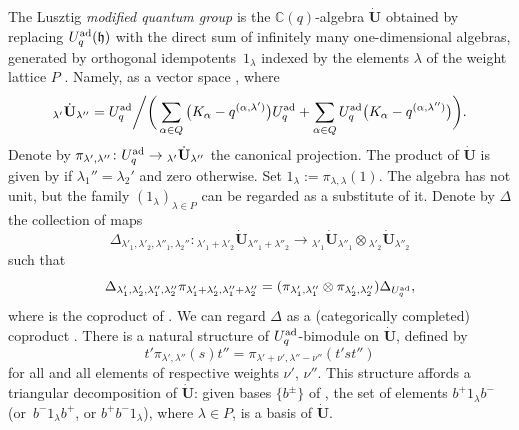 \documentclass[10pt,a4paper]{amsart}
\numberwithin{equation}{section}
\theoremstyle{definition}
\newcommand{\mc}{\mathbb{C}}
\newcommand{\ra}{\rightarrow}
\begin{document}
The Lusztig {\it modified quantum group} is the $\mc(q)$-algebra $\dot{\mathbf{U}}$ obtained by replacing $U_q^{\rm ad}(\mathfrak{h})$ with the direct sum of infinitely many one-dimensional algebras, generated by orthogonal idempotents~$1_\lambda$ indexed by the elements $\lambda$ of the weight lattice $P$ \cite[Chapter~23]{Lusztig}. Namely, as a vector space , where
\[{}_{\lambda'}\dot{\mathbf{U}}{}_{\lambda''} = U_q^{\rm ad}\bigg/\bigg(\sum_{\alpha\in Q} \big(K_\alpha -q^{(\alpha,\lambda')}\big)U_q^{\rm ad}+ \sum_{\alpha\in Q} U_q^{\rm ad}\big(K_\alpha -q^{(\alpha,\lambda'')}\big)\bigg).\]
Denote by $\pi_{\lambda',\lambda''}\colon U_q^{\rm ad} \ra {}_{\lambda'}\dot{\mathbf{U}}{}_{\lambda''}$ the canonical projection. The product of $\dot{\mathbf{U}}$ is given by  if $\lambda_1''=\lambda_2'$ and zero otherwise. Set $1_\lambda := \pi_{\lambda,\lambda}(1)$. The algebra  has not unit, but the family $(1_\lambda)_{\lambda\in P}$ can be regarded as a substitute of it. Denote by $\Delta$ the collection of maps
\[
\Delta_{\lambda'_1,\lambda'_2,\lambda''_1,\lambda_2''} \colon {}_{\lambda'_1+\lambda'_2} \dot{\mathbf{U}} {}_{\lambda''_1+\lambda''_2} \ra {}_{\lambda'_1} \dot{\mathbf{U}} {}_{\lambda''_1}\otimes {}_{\lambda'_2} \dot{\mathbf{U}} {}_{\lambda''_2}
\]
 such that
\begin{equation}\label{defcoprod}
\Delta_{\lambda'_1,\lambda'_2,\lambda''_1,\lambda''_2} \pi_{\lambda'_1+\lambda'_2,\lambda''_1+\lambda''_2} = (\pi_{\lambda'_1,\lambda''_1}\otimes \pi_{\lambda'_2,\lambda''_2})\Delta_{U_q^{\rm ad}},
\end{equation}
where  is the coproduct of . We can regard $\Delta$ as a (categorically completed) coproduct \smash{$\Delta \colon \dot{\mathbf{U}} \ra \dot{\mathbf{U}} {}^{\hat{\otimes}2}$}. There is a natural structure of $U_q^{\rm ad}$-bimodule on $\dot{\mathbf{U}}$, defined by
\begin{equation}\label{bimodstr}
t'\pi_{\lambda',\lambda''}(s)t'' = \pi_{\lambda'+\nu',\lambda''-\nu''}(t'st'')
\end{equation}
for all  and all elements  of respective weights $\nu'$, $\nu''$. This structure affords a triangular decomposition of $\dot{\mathbf{U}}$: given bases $\{b^\pm\}$ of , the set of elements $b^+1_\lambda b^-$ (or~$b^-1_\lambda b^+$, or $b^+b^-1_\lambda$), where $\lambda\in P$, is a basis of $\dot{\mathbf{U}}$.
\end{document}
